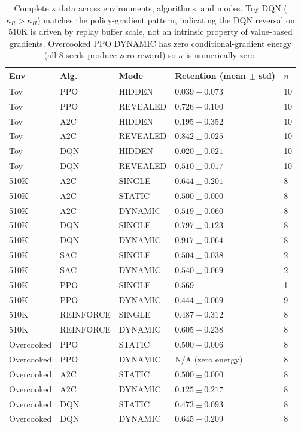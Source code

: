 \documentclass[letterpaper]{article}
\begin{document}
\begin{table}
\centering
\scriptsize
\setlength{\tabcolsep}{2pt}
\begin{tabular}{lllll}
\toprule
Env & Alg. & Mode & Retention (mean $\pm$ std) & $n$ \\
\midrule
Toy      & PPO & HIDDEN   & $0.039 \pm 0.073$ & 10 \\
Toy      & PPO & REVEALED & $0.726 \pm 0.100$ & 10 \\
Toy      & A2C & HIDDEN   & $0.195 \pm 0.352$ & 10 \\
Toy      & A2C & REVEALED & $0.842 \pm 0.025$ & 10 \\
Toy      & DQN & HIDDEN   & $0.020 \pm 0.021$ & 10 \\
Toy      & DQN & REVEALED & $0.510 \pm 0.017$ & 10 \\
510K     & A2C & SINGLE   & $0.644 \pm 0.201$ & 8 \\
510K     & A2C & STATIC   & $0.500 \pm 0.000$ & 8 \\
510K     & A2C & DYNAMIC  & $0.519 \pm 0.060$ & 8 \\
510K     & DQN & SINGLE   & $0.797 \pm 0.123$ & 8 \\
510K     & DQN & DYNAMIC  & $0.917 \pm 0.064$ & 8 \\
510K     & SAC & SINGLE   & $0.504 \pm 0.038$ & 2 \\
510K     & SAC & DYNAMIC  & $0.540 \pm 0.069$ & 2 \\
510K     & PPO & SINGLE   & $0.569$           & 1 \\
510K     & PPO & DYNAMIC  & $0.444 \pm 0.069$ & 9 \\
510K     & REINFORCE & SINGLE  & $0.487 \pm 0.312$ & 8 \\
510K     & REINFORCE & DYNAMIC & $0.605 \pm 0.238$ & 8 \\
Overcooked & PPO & STATIC  & $0.500 \pm 0.006$ & 8 \\
Overcooked & PPO & DYNAMIC & N/A (zero energy) & 8 \\
Overcooked & A2C & STATIC  & $0.500 \pm 0.000$ & 8 \\
Overcooked & A2C & DYNAMIC & $0.125 \pm 0.217$ & 8 \\
Overcooked & DQN & STATIC  & $0.473 \pm 0.093$ & 8 \\
Overcooked & DQN & DYNAMIC & $0.645 \pm 0.209$ & 8 \\
\bottomrule
\end{tabular}
\caption{Complete $\kappa$ data across environments, algorithms, and modes.
Toy DQN ($\kappa_R > \kappa_H$) matches the policy-gradient pattern, indicating the DQN reversal on 510K is driven by replay buffer scale, not an intrinsic property of value-based gradients.
Overcooked PPO DYNAMIC has zero conditional-gradient energy (all 8 seeds produce zero reward) so $\kappa$ is numerically zero.}
\end{table}
\end{document}
